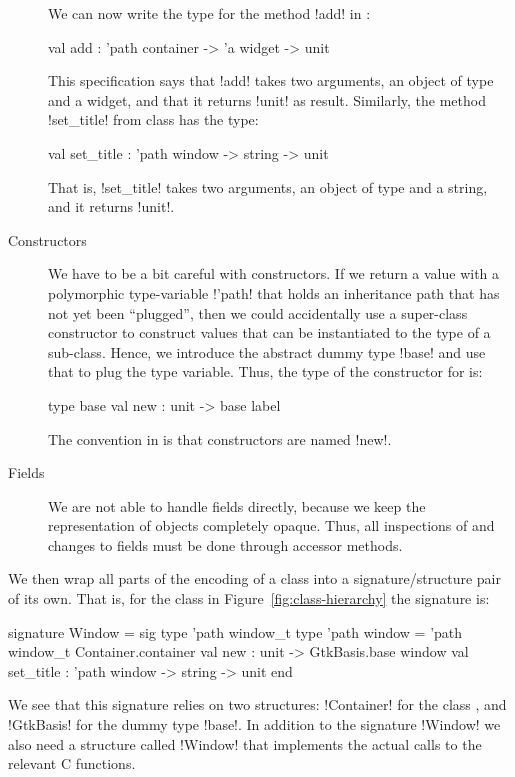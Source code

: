 \documentclass[finalversion]{usetex-v1}
\begin{document}
\begin{description}
  We can now write the type for the method !add! in
  :
\begin{SMLcode}
val add : 'path container -> 'a widget 
                               -> unit
\end{SMLcode}
This specification says that !add! takes two arguments, an object of type
 and a widget, and that it returns !unit! as result.
Similarly,  the method !set_title! from class
 has the type:
\begin{SMLcode}
val set_title : 'path window -> string 
                               -> unit
\end{SMLcode}
That is, !set_title! takes two arguments, an object of type 
 and a string, and it returns !unit!.


\item[Constructors] We have to be a bit careful with constructors.  If
  we return a value with a polymorphic type-variable !'path!
  that holds an inheritance path that has not yet been ``plugged'',
  then we could accidentally use a super-class constructor to construct
  values that can be instantiated to the type of a sub-class.  Hence,
  we introduce the abstract dummy type !base! and use that to plug the
  type variable.  Thus, the type of the constructor for
   is:
\begin{SMLcode}
type base
val new : unit -> base label
\end{SMLcode}
The convention in \gtk is that constructors are named !new!.

\item[Fields] We are not able to handle fields directly, because we
  keep the representation of objects completely opaque.  Thus, all
  inspections of and changes to fields must be done through accessor
  methods.

\end{description}

We then wrap all parts of the encoding of a class into a
 signature/structure
 pair of its own.  That is, for the class 
in Figure~\ref{fig:class-hierarchy} the \sml signature is:
\begin{SMLcode}
signature Window =
sig
  type 'path window_t
  type 'path window = 
      'path window_t Container.container
  val new : unit -> GtkBasis.base window
  val set_title : 'path window -> string 
                                 -> unit
end
\end{SMLcode}
We see that this signature relies on two structures:
!Container! for the class , and !GtkBasis! for the dummy
type !base!.  In addition to the signature !Window! we also need a
structure called !Window! that implements the actual calls to the
relevant \gtk C functions.
\end{document}

